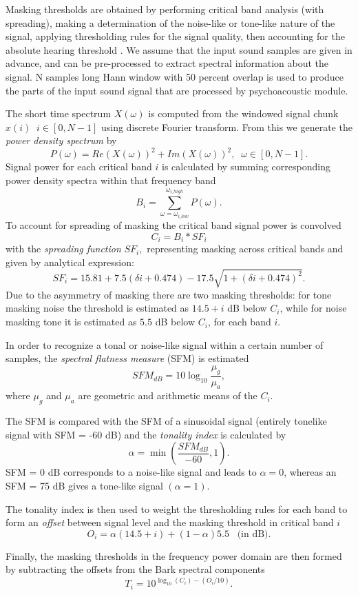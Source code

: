 Masking thresholds are obtained by performing critical band analysis (with spreading), making a determination of the noise-like or tone-like nature of the signal, applying thresholding rules for the signal quality, then accounting for the absolute hearing threshold \cite{painter2000perceptual}. 
We assume that the input sound samples are given in advance, and can be pre-processed to extract spectral information about the signal. N samples long Hann window with 50 percent overlap is used to produce the parts of the input sound signal that are processed by psychoacoustic module.

The short time spectrum \( X(\omega) \) is computed from the windowed signal chunk \( x(i) \;\; i \in [0, N-1]\) using discrete Fourier transform. From this we generate the \emph{power density spectrum} by
\[ P(\omega) = Re(X(\omega))^2 + Im(X(\omega))^2, \;\; \omega \in [0, N-1]. \]
Signal power for each critical band \(i\) is calculated by summing corresponding power density spectra within that frequency band
\[ B_i = \sum_{\omega = \omega_{i\_low}}^{\omega_{i\_high}} P(\omega). \]
To account for spreading of masking the critical band signal power is convolved 
\[ C_i = B_i * SF_i \]
with the \emph{spreading function} \( SF_i, \) representing masking across critical bands and given by analytical expression:
\[ SF_i = 15.81 + 7.5(\delta i + 0.474) - 17.5\sqrt{1 + (\delta i + 0.474)^2} .\]
Due to the asymmetry of masking there are two masking thresholds: for tone masking noise the threshold is estimated as \( 14.5 + i\) dB below \( C_i \), while for noise masking tone it is estimated as \( 5.5 \) dB below \( C_i \), for each band \( i \). 

In order to recognize a tonal or noise-like signal within a certain number of samples, the \emph{spectral flatness measure} (SFM) is estimated
\[ SFM_{dB} = 10 \log_{10} \frac{\mu_g}{\mu_a}, \]
where \( \mu_g \) and \( \mu_a \) are geometric and arithmetic means of the \( C_i \).

The SFM is compared with the SFM of a sinusoidal signal (entirely tonelike signal with SFM = -60 dB)
and the \emph{tonality index} is calculated \cite{johnston1988estimation} by
\[ \alpha = \min (\frac{SFM_{dB}}{-60}, 1) .\]
SFM = 0 dB corresponds to a noise-like signal and leads to \( \alpha = 0 \), whereas an SFM = 75 dB gives a tone-like signal \( (\alpha = 1) \).

The tonality index is then used to weight the thresholding rules for each band to form an \emph{offset} between signal level and the masking threshold in critical band \( i \)
\[ O_i = \alpha(14.5 + i) + (1 - \alpha)5.5 \;\;\; \text{(in dB)}.\]

Finally, the masking thresholds in the frequency power domain are then formed by subtracting the offsets from the Bark spectral components
\[ T_i = 10^{\log_{10}(C_i) - (O_i/10)} .\]
